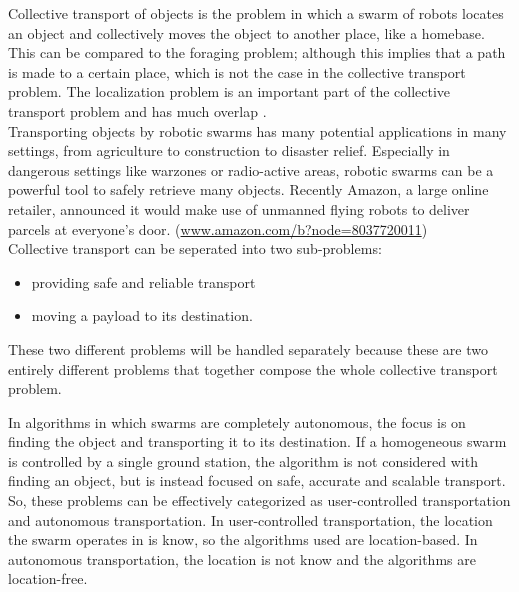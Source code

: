 
Collective transport of objects is the problem in which a swarm of robots locates an object and collectively moves the object to another place, like a homebase. 
This can be compared to the foraging problem; although this implies that a path is made to a certain place, which is not the case in the collective transport problem. \cite{hoff2010two}  
The localization problem is an important part of the collective transport problem and has much overlap .\\
Transporting objects by robotic swarms has many potential applications in many settings, from agriculture to construction to disaster relief. 
Especially in dangerous settings like warzones or radio-active areas, robotic swarms can be a powerful tool to safely retrieve many objects. 
Recently Amazon, a large online retailer, announced it would make use of unmanned flying robots to deliver parcels at everyone's door. (\url{www.amazon.com/b?node=8037720011}) \\

Collective transport can be seperated into two sub-problems:
\begin{itemize}
	\item  providing safe and reliable transport
	\item moving a payload to its destination.
\end{itemize}
These two different problems will be handled separately because these are two entirely different problems that together compose the whole collective transport problem. 

In algorithms in which swarms are completely autonomous, the focus is on finding the object and transporting it to its destination.
If a homogeneous swarm is controlled by a single ground station, the algorithm is not considered with finding an object, but is instead focused on safe, accurate and scalable transport. 
So, these problems can be effectively categorized as user-controlled transportation and autonomous transportation.
In user-controlled transportation, the location the swarm operates in is know, so the algorithms used are location-based.
In autonomous transportation, the location is not know and the algorithms are location-free. \\

